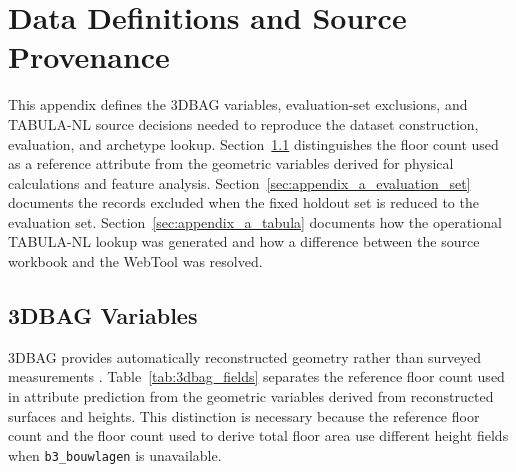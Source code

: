 \chapter{Data Definitions and Source Provenance}
\label{ch:appendix_a}

This appendix defines the 3DBAG variables, evaluation-set exclusions, and TABULA-NL source decisions needed to reproduce the dataset construction, evaluation, and archetype lookup.
Section~\ref{sec:appendix_a_3dbag} distinguishes the floor count used as a reference attribute from the geometric variables derived for physical calculations and feature analysis.
Section~\ref{sec:appendix_a_evaluation_set} documents the records excluded when the fixed holdout set is reduced to the evaluation set.
Section~\ref{sec:appendix_a_tabula} documents how the operational TABULA-NL lookup was generated and how a difference between the source workbook and the WebTool was resolved.

\section{3DBAG Variables}
\label{sec:appendix_a_3dbag}

3DBAG provides automatically reconstructed geometry rather than surveyed measurements \parencite{threedbagdocs,peters2022,dukai2021}.
Table~\ref{tab:3dbag_fields} separates the reference floor count used in attribute prediction from the geometric variables derived from reconstructed surfaces and heights.
This distinction is necessary because the reference floor count and the floor count used to derive total floor area use different height fields when \texttt{b3\_bouwlagen} is unavailable.

